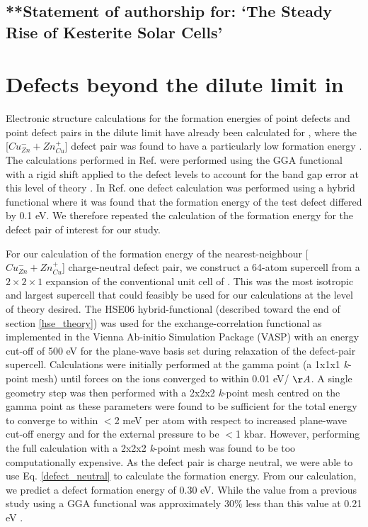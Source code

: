 \documentclass[11pt, twoside]{report}
\begin{document}
\subsection{**Statement of authorship for: `The Steady Rise of Kesterite Solar Cells'}




\section{Defects beyond the dilute limit in {\CZTS}}\label{CZTS_beyond_dilute}
Electronic structure calculations for the formation energies of point defects and point defect pairs in the dilute limit have already been calculated for {\CZTS}, where the [$Cu_{Zn}^- + Zn_{Cu}^+$] defect pair was found to have a particularly low formation energy \cite{defects_Chen}.
The calculations performed in Ref.  were performed using the GGA functional with a rigid shift applied to the defect levels to account for the band gap error at this level of theory \cite{Lany_defects}. In Ref.  one defect calculation was performed using a hybrid functional where it was found that the formation energy of the test defect differed by 0.1 eV. We therefore repeated the calculation of the formation energy for the defect pair of interest for our study.

For our calculation of the formation energy of the nearest-neighbour [$Cu_{Zn}^- + Zn_{Cu}^+$] charge-neutral defect pair, we construct a 64-atom supercell from a $2\times2\times1$ expansion of the conventional unit cell of {\CZTS}. This was the most isotropic and largest supercell that could feasibly be used for our calculations at the level of theory desired.
The HSE06 hybrid-functional \cite{HSE} (described toward the end of section \ref{hse_theory}) was used for the exchange-correlation functional as implemented in the Vienna Ab-initio Simulation Package (VASP) \cite{VASP} with an energy cut-off of 500 eV for the plane-wave basis set during relaxation of the defect-pair supercell. Calculations were initially performed at the gamma point (a 1x1x1 \textit{k}-point mesh) until forces on the ions converged to within 0.01 eV/ $\AA$. 
A single geometry step was then performed with a 2x2x2 \textit{k}-point mesh centred on the gamma point as these parameters were found to be sufficient for the total energy to converge to within $<$2 meV per atom with respect to increased plane-wave cut-off energy and for the external pressure to be $<$1 kbar. However, performing the full calculation with a 2x2x2 \textit{k}-point mesh was found to be too computationally expensive. 
As the defect pair is charge neutral, we were able to use Eq. \ref{defect_neutral} to calculate the formation energy. From our calculation, we predict a defect formation energy of 0.30 eV. While the value from a previous study using a GGA functional was approximately 30\% less than this value at 0.21 eV \cite{defects_Chen}.
\end{document}
